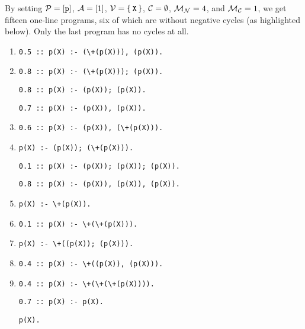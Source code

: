 By setting $\mathcal{P}{} = [\texttt{p}]$, $\mathcal{A}{} = [1]$, $\mathcal{V}{} =
\{\, \texttt{X} \,\}$, $\mathcal{C}{} = \emptyset$, $\mathcal{M}_{\mathcal{N}}{} = 4$, and
$\mathcal{M}_{\mathcal{C}}{} = 1$, we get fifteen one-line programs, six of which are
without negative cycles (as highlighted below). Only the last program has no
cycles at all.

\begin{enumerate}[label=\arabic*.]
\item
\begin{verbatim}
0.5 :: p(X) :- (\+(p(X))), (p(X)).
\end{verbatim}
\item
\begin{verbatim}
0.8 :: p(X) :- (\+(p(X))); (p(X)).
\end{verbatim}
\hlitem
\begin{verbatim}
0.8 :: p(X) :- (p(X)); (p(X)).
\end{verbatim}
\hlitem
\begin{verbatim}
0.7 :: p(X) :- (p(X)), (p(X)).
\end{verbatim}
\item
\begin{verbatim}
0.6 :: p(X) :- (p(X)), (\+(p(X))).
\end{verbatim}
\item
\begin{verbatim}
p(X) :- (p(X)); (\+(p(X))).
\end{verbatim}
\hlitem
\begin{verbatim}
0.1 :: p(X) :- (p(X)); (p(X)); (p(X)).
\end{verbatim}
\hlitem
\begin{verbatim}
0.8 :: p(X) :- (p(X)), (p(X)), (p(X)).
\end{verbatim}
\item
\begin{verbatim}
p(X) :- \+(p(X)).
\end{verbatim}
\item
\begin{verbatim}
0.1 :: p(X) :- \+(\+(p(X))).
\end{verbatim}
\item
\begin{verbatim}
p(X) :- \+((p(X)); (p(X))).
\end{verbatim}
\item
\begin{verbatim}
0.4 :: p(X) :- \+((p(X)), (p(X))).
\end{verbatim}
\item
\begin{verbatim}
0.4 :: p(X) :- \+(\+(\+(p(X)))).
\end{verbatim}
\hlitem
\begin{verbatim}
0.7 :: p(X) :- p(X).
\end{verbatim}
\hlitem
\begin{verbatim}
p(X).
\end{verbatim}
\end{enumerate}

